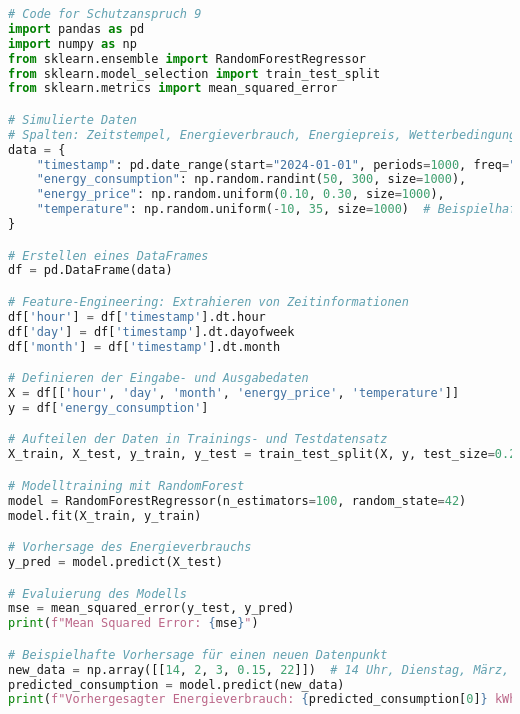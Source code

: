{}
\begin{lstlisting}[language=python,caption=Code für Schutzanspruch 9, label=lst:schutz9]
# Code for Schutzanspruch 9
import pandas as pd
import numpy as np
from sklearn.ensemble import RandomForestRegressor
from sklearn.model_selection import train_test_split
from sklearn.metrics import mean_squared_error

# Simulierte Daten
# Spalten: Zeitstempel, Energieverbrauch, Energiepreis, Wetterbedingungen
data = {
    "timestamp": pd.date_range(start="2024-01-01", periods=1000, freq="H"),
    "energy_consumption": np.random.randint(50, 300, size=1000),
    "energy_price": np.random.uniform(0.10, 0.30, size=1000),
    "temperature": np.random.uniform(-10, 35, size=1000)  # Beispielhafte Wetterbedingung
}

# Erstellen eines DataFrames
df = pd.DataFrame(data)

# Feature-Engineering: Extrahieren von Zeitinformationen
df['hour'] = df['timestamp'].dt.hour
df['day'] = df['timestamp'].dt.dayofweek
df['month'] = df['timestamp'].dt.month

# Definieren der Eingabe- und Ausgabedaten
X = df[['hour', 'day', 'month', 'energy_price', 'temperature']]
y = df['energy_consumption']

# Aufteilen der Daten in Trainings- und Testdatensatz
X_train, X_test, y_train, y_test = train_test_split(X, y, test_size=0.2, random_state=42)

# Modelltraining mit RandomForest
model = RandomForestRegressor(n_estimators=100, random_state=42)
model.fit(X_train, y_train)

# Vorhersage des Energieverbrauchs
y_pred = model.predict(X_test)

# Evaluierung des Modells
mse = mean_squared_error(y_test, y_pred)
print(f"Mean Squared Error: {mse}")

# Beispielhafte Vorhersage für einen neuen Datenpunkt
new_data = np.array([[14, 2, 3, 0.15, 22]])  # 14 Uhr, Dienstag, März, Energiepreis 0.15, 22 Grad
predicted_consumption = model.predict(new_data)
print(f"Vorhergesagter Energieverbrauch: {predicted_consumption[0]} kWh")
\end{lstlisting}


